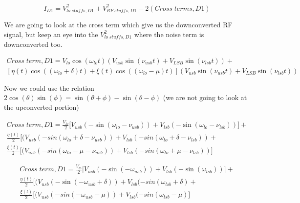 \begin{equation}
    I_{D1}= V_{lo\; stuffs,D1}^2 + V_{RF\: stuffs, D1}^2 - 2(Cross\; terms,D1)
\end{equation}

We are going to look at the cross term which give us the downconverted RF signal, but keep an eye into the $V_{lo\; stuffs,D1}^2$ where the noise term is downconverted too.


\begin{equation}
    \begin{gathered}
        Cross\;term,D1 = V_{lo}\cos(\omega_{lo}t)\left(
        V_{usb}\sin(\nu_{usb}t)+V_{LSB}\sin(\nu_{lsb}t)
        \right) + \\
        [\eta(t)\cos((\omega_{lo}+\delta)t)+\xi(t)\cos((\omega_{lo}-\mu)t)] \left(
        V_{usb}\sin(\nu_{usb}t)+V_{LSB}\sin(\nu_{lsb}t)
        \right)
    \end{gathered}
\end{equation}
\vspace{0.5cm}

Now we could use the relation $2\cos(\theta)\sin(\phi)=\sin(\theta+\phi)-\sin(\theta-\phi)$ (we are not going to look at the upconverted portion)


\begin{equation}
    \label{eq:d1_cross}
    \begin{gathered}
        Cross\;term,D1 = \frac{V_{lo}}{2} \big[
        V_{usb}(-\sin(\omega_{lo}-\nu_{usb})) +  V_{lsb}(
        -\sin(\omega_{lo}-\nu_{lsb})) \big] +\\
        \frac{\eta(t)}{2} \big[ (V_{usb} (-sin(\omega_{lo}+\delta-\nu_{usb})
        )+V_{lsb}(-sin(\omega_{lo}+\delta-\nu_{lsb}))+\\
        \frac{\xi(t)}{2} \big[ (V_{usb} (-sin(\omega_{lo}-\mu-\nu_{usb})
        )+V_{lsb}(-sin(\omega_{lo}+\mu-\nu_{lsb}))
        \big]
    \end{gathered}
\end{equation}

\vspace{1cm}
\begin{equation}
    \begin{gathered}
    Cross\;term,D1 = \frac{V_{lo}}{2} \big[
        V_{usb}(-\sin(-\omega_{usb})) +  V_{lsb}(
        -\sin(\omega_{lsb})) \big] +\\
        \frac{\eta(t)}{2} \big[ (V_{usb} (-\sin(-\omega_{usb}+\delta)
        )+V_{lsb}(-sin(\omega_{lsb}+\delta)+\\
        \frac{\xi(t)}{2} \big[ (V_{usb} (-sin(-\omega_{usb}-\mu)
        )+V_{lsb}(-sin(\omega_{lsb}-\mu)
        \big]
    \end{gathered}
\end{equation}
\vspace{0.5cm}

